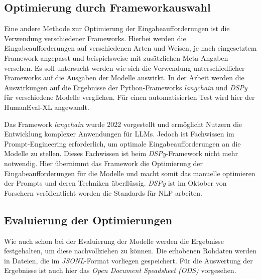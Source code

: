 \subsection{Optimierung durch Frameworkauswahl}
Eine andere Methode zur Optimierung der Eingabeaufforderungen ist die Verwendung verschiedener Frameworks. Hierbei werden die Eingabeaufforderungen auf verschiedenen Arten und Weisen, je nach eingesetztem Framework angepasst und beispielsweise mit zusätzlichen Meta-Angaben versehen. Es soll untersucht werden wie sich die Verwendung unterschiedlicher Frameworks auf die Ausgaben der Modelle auswirkt. In der Arbeit werden die Auswirkungen auf die Ergebnisse der Python-Frameworks \textit{langchain} und \textit{DSPy} für verschiedene Modelle verglichen. Für einen automatisierten Test wird hier der HumanEval-XL angewandt.\vspace{0.2cm}

Das Framework \textit{langchain} wurde 2022 vorgestellt und ermöglicht Nutzern die Entwicklung komplexer Anwendungen für LLMs. Jedoch ist Fachwissen im Prompt-Engineering erforderlich, um optimale Eingabeaufforderungen an die Modelle zu stellen. Dieses Fachwissen ist beim \textit{DSPy}-Framework nicht mehr notwendig. Hier übernimmt das Framework die Optimierung der Eingabeaufforderungen für die Modelle und macht somit das manuelle optimieren der Prompts und deren Techniken überflüssig. \textit{DSPy} ist im Oktober von Forschern veröffentlicht worden die Standards für NLP arbeiten.\vspace{0.2cm}


\subsection{Evaluierung der Optimierungen}
Wie auch schon bei der Evaluierung der Modelle werden die Ergebnisse festgehalten, um diese nachvollziehen zu können. Die erhobenen Rohdaten werden in Dateien, die im \textit{JSONL}-Format vorliegen gespeichert. Für die Auswertung der Ergebnisse ist auch hier das \textit{Open Document Speadsheet (ODS)} vorgesehen.\vspace{0.2cm}

